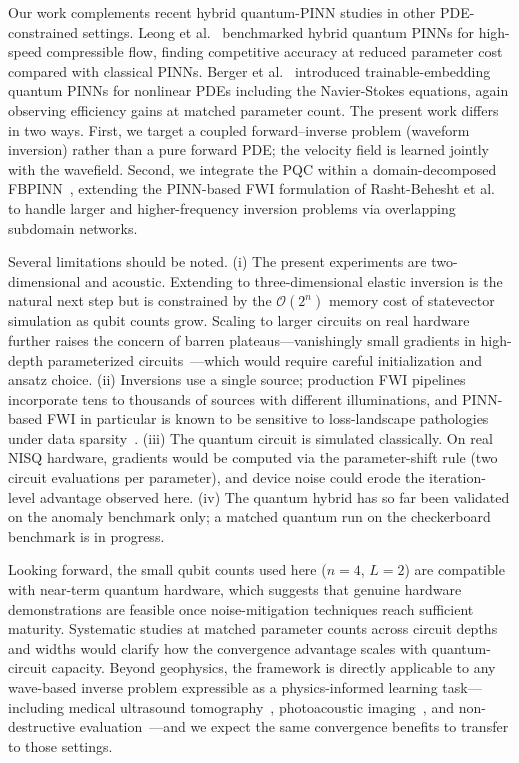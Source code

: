 Our work complements recent hybrid quantum-PINN studies in other PDE-constrained settings. Leong et al.~\cite{LEONG2025106782} benchmarked hybrid quantum PINNs for high-speed compressible flow, finding competitive accuracy at reduced parameter cost compared with classical PINNs. Berger et al.~\cite{Berger2025} introduced trainable-embedding quantum PINNs for nonlinear PDEs including the Navier-Stokes equations, again observing efficiency gains at matched parameter count. The present work differs in two ways. First, we target a coupled forward--inverse problem (waveform inversion) rather than a pure forward PDE; the velocity field is learned jointly with the wavefield. Second, we integrate the PQC within a domain-decomposed FBPINN~\cite{Moseley2023}, extending the PINN-based FWI formulation of Rasht-Behesht et al.~\cite{rahst} to handle larger and higher-frequency inversion problems via overlapping subdomain networks.

Several limitations should be noted. (i) The present experiments are two-dimensional and acoustic. Extending to three-dimensional elastic inversion is the natural next step but is constrained by the $\mathcal{O}(2^n)$ memory cost of statevector simulation as qubit counts grow. Scaling to larger circuits on real hardware further raises the concern of barren plateaus---vanishingly small gradients in high-depth parameterized circuits~---which would require careful initialization and ansatz choice. (ii) Inversions use a single source; production FWI pipelines incorporate tens to thousands of sources with different illuminations, and PINN-based FWI in particular is known to be sensitive to loss-landscape pathologies under data sparsity~. (iii) The quantum circuit is simulated classically. On real NISQ hardware, gradients would be computed via the parameter-shift rule (two circuit evaluations per parameter), and device noise could erode the iteration-level advantage observed here. (iv) The quantum hybrid has so far been validated on the anomaly benchmark only; a matched quantum run on the checkerboard benchmark is in progress.

Looking forward, the small qubit counts used here ($n=4$, $L=2$) are compatible with near-term quantum hardware, which suggests that genuine hardware demonstrations are feasible once noise-mitigation techniques reach sufficient maturity. Systematic studies at matched parameter counts across circuit depths and widths would clarify how the convergence advantage scales with quantum-circuit capacity. Beyond geophysics, the framework is directly applicable to any wave-based inverse problem expressible as a physics-informed learning task---including medical ultrasound tomography~\cite{10.1121/1.3699240,Sandhu_2015}, photoacoustic imaging~\cite{Wang2016}, and non-destructive evaluation~\cite{7422116}---and we expect the same convergence benefits to transfer to those settings.








